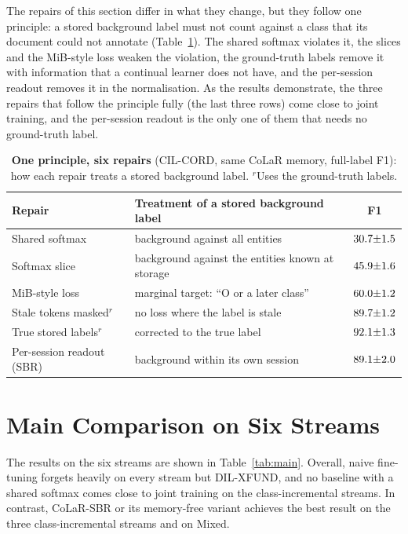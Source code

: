 The repairs of this section differ in what they change, but they follow one principle: a
stored background label must not count against a class that its document could not
annotate (Table~\ref{tab:scope}). The shared softmax violates it, the slices and the
MiB-style loss weaken the violation, the ground-truth labels remove it with information
that a continual learner does not have, and the per-session readout removes it in the
normalisation. As the results demonstrate, the three repairs that follow the principle fully
(the last three rows) come close to joint training, and the per-session readout is the
only one of them that needs no ground-truth label.

\begin{table}[!htbp]
  \centering
  \caption[One principle, six repairs]{\textbf{One principle, six repairs} (CIL-CORD, same
  CoLaR memory, full-label F1): how each repair treats a stored background label.
  $^{r}$Uses the ground-truth labels.}
  \label{tab:scope}
  \begin{tabular}{@{}llc@{}}
    \toprule
    Repair & Treatment of a stored background label & F1 \\
    \midrule
    Shared softmax & background against all entities & $30.7{\pm}1.5$ \\
    Softmax slice & background against the entities known at storage & $45.9{\pm}1.6$ \\
    MiB-style loss & marginal target: ``O or a later class'' & $60.0{\pm}1.2$ \\
    Stale tokens masked$^{r}$ & no loss where the label is stale & $89.7{\pm}1.2$ \\
    True stored labels$^{r}$ & corrected to the true label & $92.1{\pm}1.3$ \\
    Per-session readout (SBR) & background within its own session & $89.1{\pm}2.0$ \\
    \bottomrule
  \end{tabular}
\end{table}

\section{Main Comparison on Six Streams}
\label{sec:c6-s3}

The results on the six streams are shown in Table~\ref{tab:main}. Overall, naive
fine-tuning forgets heavily on every stream but DIL-XFUND, and no baseline with a shared
softmax comes close to joint training on the class-incremental streams. In contrast,
CoLaR-SBR or its memory-free variant achieves the best result on the three
class-incremental streams and on Mixed.

